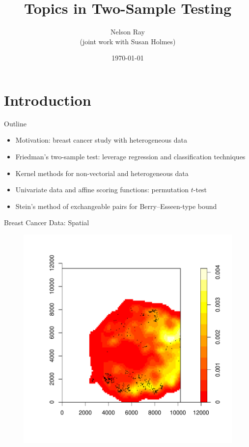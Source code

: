 \documentclass{beamer}
\begin{document}
\title[Topics in Two-Sample Testing]{Topics in Two-Sample Testing}
\author[N. Ray]{Nelson Ray \\
  (joint work with Susan Holmes)}
\date{\today}

\begin{frame}
  \titlepage
\end{frame}


\section{Introduction}
\begin{frame}{Outline}
  \begin{itemize}
  \item Motivation: breast cancer study with heterogeneous data \pause
  \item Friedman's two-sample test:
    leverage regression and classification techniques \pause
  \item Kernel methods for non-vectorial and heterogeneous data \pause
  \item Univariate data and affine scoring functions: permutation
    $t$-test \pause
  \item Stein's method of exchangeable pairs for Berry--Esseen-type bound
  \end{itemize}
\end{frame}

\begin{frame}{Breast Cancer Data: Spatial}
  \begin{figure}
    \centering
    \includegraphics[scale=.5]{Fig2healthyDC.pdf}
  \end{figure}
\end{frame}
\end{document}
